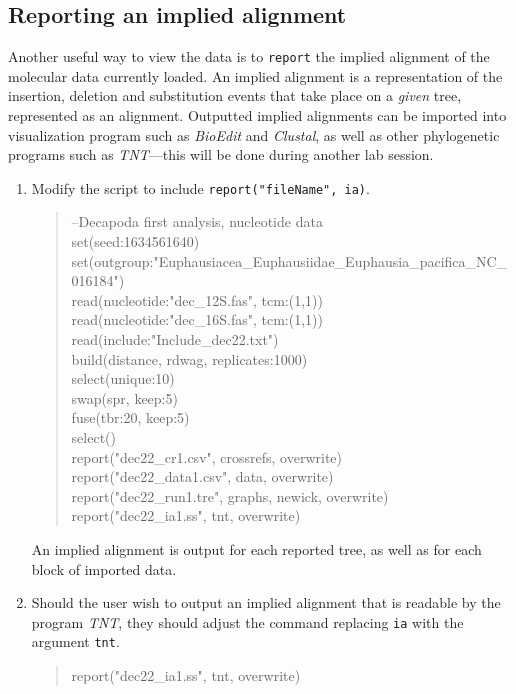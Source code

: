 \documentclass[11pt]{article}
\begin{document}
\subsection{Reporting an implied alignment}
\label{subsec:ia}

Another useful way to view the data is to \texttt{report} the implied alignment of the 
molecular data currently loaded. An implied alignment is a representation of the 
insertion, deletion and substitution events that take place on a \emph{given} tree, 
represented as an alignment. Outputted implied alignments can be imported into 
visualization program such as \emph{BioEdit} and \emph{Clustal}, as well as other 
phylogenetic programs such as \emph{TNT}---this will be done during another lab 
session. 

\begin{enumerate}

\item Modify the script to include \texttt{report("fileName", ia)}.

	\begin{quote}	
	--Decapoda first analysis, nucleotide data\\
	set(seed:1634561640)\\
	set(outgroup:"Euphausiacea\_Euphausiidae\_Euphausia\_pacifica\_NC\_016184")\\
	read(nucleotide:"dec\_12S.fas", tcm:(1,1))\\
	read(nucleotide:"dec\_16S.fas", tcm:(1,1))\\
	read(include:"Include\_dec22.txt")\\
	build(distance, rdwag, replicates:1000)\\
	select(unique:10)\\
	swap(spr, keep:5)\\
	fuse(tbr:20, keep:5)\\
	select()\\
	report("dec22\_cr1.csv", crossrefs, overwrite)\\
	report("dec22\_data1.csv", data, overwrite)\\
	report("dec22\_run1.tre", graphs, newick, overwrite)
	report("dec22\_ia1.ss", tnt, overwrite)
	\end{quote}
	
An implied alignment is output for each reported tree, as well as for each block of imported data.

\item Should the user wish to output an implied alignment that is readable by the 
program \emph{TNT}, they should adjust the command  replacing \texttt{ia} with the
argument \texttt{tnt}.

	\begin{quote}
	report("dec22\_ia1.ss", tnt, overwrite)\\
	\end{quote}
	
\end{enumerate}
\end{document}
